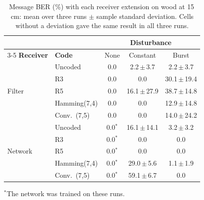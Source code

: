 \begin{table}[!t]
\centering
\caption{Message BER (\%) with each receiver extension on wood at 15\,cm: mean over three runs $\pm$ sample standard deviation. Cells without a deviation gave the same result in all three runs.}
\label{tab:msg_extensions}
\footnotesize
\setlength{\tabcolsep}{4pt}
\begin{tabular*}{\columnwidth}{@{\extracolsep{\fill}}llccc@{}}
\toprule
 & & \multicolumn{3}{c}{\textbf{Disturbance}} \\
\cmidrule(lr){3-5}
\textbf{Receiver} & \textbf{Code} & None & Constant & Burst \\
\midrule
\multirow{5}{*}{Filter} & Uncoded & 0.0 & 2.2{\scriptsize\,$\pm$\,3.7} & 2.2{\scriptsize\,$\pm$\,3.7} \\
 & R3 & 0.0 & 0.0 & 30.1{\scriptsize\,$\pm$\,19.4} \\
 & R5 & 0.0 & 16.1{\scriptsize\,$\pm$\,27.9} & 38.7{\scriptsize\,$\pm$\,14.8} \\
 & Hamming(7,4) & 0.0 & 0.0 & 12.9{\scriptsize\,$\pm$\,14.8} \\
 & Conv.\ (7,5) & 0.0 & 0.0 & 14.0{\scriptsize\,$\pm$\,24.2} \\
\midrule
\multirow{5}{*}{Network} & Uncoded & 0.0$^{*}$ & 16.1{\scriptsize\,$\pm$\,14.1} & 3.2{\scriptsize\,$\pm$\,3.2} \\
 & R3 & 0.0$^{*}$ & 0.0 & 0.0 \\
 & R5 & 0.0$^{*}$ & 0.0 & 0.0 \\
 & Hamming(7,4) & 0.0$^{*}$ & 29.0{\scriptsize\,$\pm$\,5.6} & 1.1{\scriptsize\,$\pm$\,1.9} \\
 & Conv.\ (7,5) & 0.0$^{*}$ & 59.1{\scriptsize\,$\pm$\,6.7} & 0.0 \\
\bottomrule
\end{tabular*}
\par\vspace{2pt}
\begin{minipage}{\columnwidth}\scriptsize
$^{*}$The network was trained on these runs.
\end{minipage}
\end{table}
